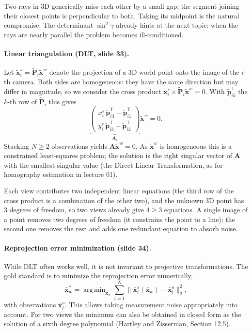 \documentclass[11pt,a4paper]{article}
\newcommand{\norm}[1]{\lVert #1\rVert}
\newcommand{\tr}{^{\mathsf T}}
\DeclareMathOperator{\argmin}{arg\,min}
\begin{document}
\begin{intuition}
Two rays in 3D generically miss each other by a small gap; the segment joining their closest points is perpendicular to both. Taking its midpoint is the natural compromise. The determinant $\sin^2\gamma$ already hints at the next topic: when the rays are nearly parallel the problem becomes ill-conditioned.
\end{intuition}

\paragraph{Linear triangulation (DLT, slide 33).}
Let $\tilde{\bm x}^s_i=\tilde{\bm P}_i\tilde{\bm x}^w$ denote the projection of a 3D world point onto the image of the $i$-th camera. Both sides are homogeneous: they have the same direction but may differ in magnitude, so we consider the cross product $\bar{\bm x}^s_i\times\tilde{\bm P}_i\tilde{\bm x}^w=0$. With $\tilde{\bm p}_{ik}\tr$ the $k$-th row of $\tilde{\bm P}_i$ this gives
\[
\underbrace{\begin{pmatrix}x^s_i\,\tilde{\bm p}_{i3}\tr-\tilde{\bm p}_{i1}\tr\\ y^s_i\,\tilde{\bm p}_{i3}\tr-\tilde{\bm p}_{i2}\tr\end{pmatrix}}_{\bm A_i}\tilde{\bm x}^w=0 .
\]
Stacking $N\ge2$ observations yields $\bm A\tilde{\bm x}^w=0$. As $\tilde{\bm x}^w$ is homogeneous this is a constrained least-squares problem; the solution is the right singular vector of $\bm A$ with the smallest singular value (the Direct Linear Transformation, as for homography estimation in lecture 01).

\begin{intuition}
Each view contributes two independent linear equations (the third row of the cross product is a combination of the other two), and the unknown 3D point has 3 degrees of freedom, so two views already give $4\ge3$ equations. A single image of a point removes two degrees of freedom (it constrains the point to a line); the second one removes the rest and adds one redundant equation to absorb noise.
\end{intuition}

\paragraph{Reprojection error minimization (slide 34).} While DLT often works well, it is not invariant to projective transformations. The gold standard is to minimize the reprojection error numerically,
\[
\bar{\bm x}^*_w=\argmin_{\bar{\bm x}_w}\sum_{i=1}^N\norm{\bar{\bm x}^s_i(\bar{\bm x}_w)-\bar{\bm x}^o_i}_2^2,
\]
with observations $\bar{\bm x}^o_i$. This allows taking measurement noise appropriately into account. For two views the minimum can also be obtained in closed form as the solution of a sixth degree polynomial (Hartley and Zisserman, Section 12.5).
\end{document}
